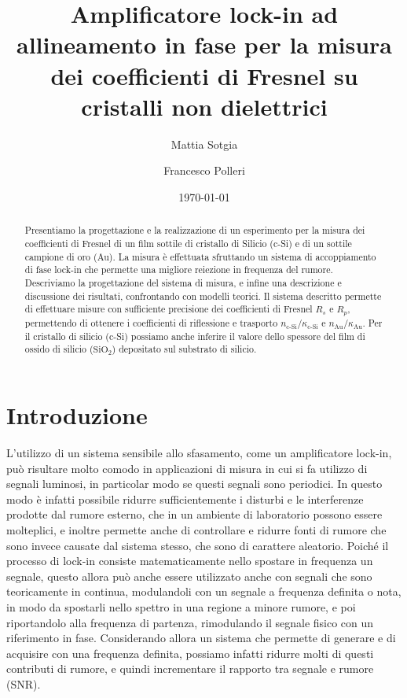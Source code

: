 \documentclass[
    prb,altaffilletter,citeautoscript,
    amsmath,amssymb,
    showpacs,showkeys,floatfix,
    reprint
]{revtex4-1}
\begin{document}
\title{Amplificatore lock-in ad allineamento in fase per la misura dei coefficienti di Fresnel su cristalli non dielettrici}
\author{Mattia Sotgia}
\author{Francesco Polleri}
\date{\today}

\begin{abstract}
    Presentiamo la progettazione e la realizzazione di un esperimento per la misura dei coefficienti di Fresnel di un film sottile di cristallo di Silicio (c-Si) e di un sottile campione di oro (Au). La misura è effettuata sfruttando un sistema di accoppiamento di fase lock-in\cite{scofieldFrequencydomainDescriptionLockin1994} che permette una migliore reiezione in frequenza del rumore. Descriviamo la progettazione del sistema di misura, e infine una descrizione e discussione dei risultati, confrontando con modelli teorici. Il sistema descritto permette di effettuare misure con sufficiente precisione dei coefficienti di Fresnel $R_s$ e $R_p$, permettendo di ottenere i coefficienti di riflessione e trasporto $n_\text{c-Si}/\kappa_\text{c-Si}$ e $n_\text{Au}/\kappa_\text{Au}$. Per il cristallo di silicio (c-Si) possiamo anche inferire il valore dello spessore del film di ossido di silicio ($\mathrm{SiO_2}$) depositato sul substrato di silicio.
\end{abstract}
\maketitle

\section{Introduzione} 

L'utilizzo di un sistema sensibile allo sfasamento, come un amplificatore lock-in, può risultare molto comodo in applicazioni di misura in cui si fa utilizzo di segnali luminosi, in particolar modo se questi segnali sono periodici. In questo modo è infatti possibile ridurre sufficientemente i disturbi e le interferenze prodotte dal rumore esterno, che in un ambiente di laboratorio possono essere molteplici, e inoltre permette anche di controllare e ridurre fonti di rumore che sono invece causate dal sistema stesso, che sono di carattere aleatorio. Poiché il processo di lock-in consiste matematicamente nello spostare in frequenza un segnale, questo allora può anche essere utilizzato anche con segnali che sono teoricamente in continua, modulandoli con un segnale a frequenza definita o nota, in modo da spostarli nello spettro in una regione a minore rumore, e poi riportandolo alla frequenza di partenza, rimodulando il segnale fisico con un riferimento in fase. Considerando allora un sistema che permette di generare e di acquisire con una frequenza definita, possiamo infatti ridurre molti di questi contributi di rumore, e quindi incrementare il rapporto tra segnale e rumore (SNR). 
\end{document}
